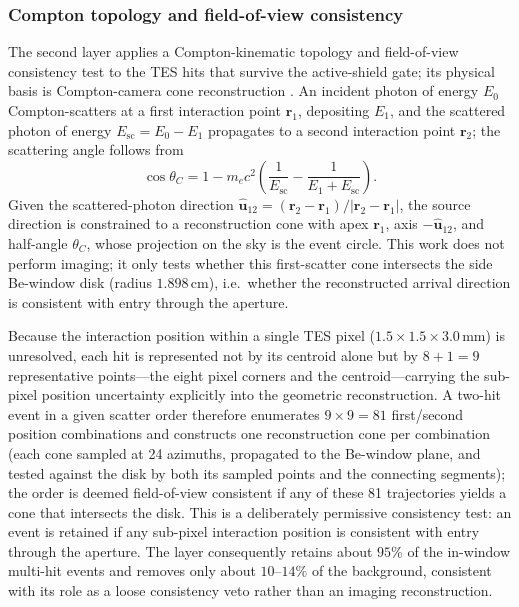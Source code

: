 \documentclass[11pt]{article}
\begin{document}
\subsubsection{Compton topology and field-of-view consistency}

The second layer applies a Compton-kinematic topology and field-of-view
consistency test to the TES hits that survive the active-shield gate; its
physical basis is Compton-camera cone reconstruction \cite{Zoglauer2006}. An
incident photon of energy $E_0$ Compton-scatters at a first interaction point
$\mathbf r_1$, depositing $E_1$, and the scattered photon of energy
$E_{\mathrm{sc}}=E_0-E_1$ propagates to a second interaction point $\mathbf r_2$;
the scattering angle follows from
\begin{equation}
  \cos\theta_C =
  1 - m_ec^2\left(\frac{1}{E_{\mathrm{sc}}}
  - \frac{1}{E_1+E_{\mathrm{sc}}}\right).
\end{equation}
Given the scattered-photon direction
$\hat{\mathbf u}_{12}=(\mathbf r_2-\mathbf r_1)/|\mathbf r_2-\mathbf r_1|$, the
source direction is constrained to a reconstruction cone with apex $\mathbf r_1$,
axis $-\hat{\mathbf u}_{12}$, and half-angle $\theta_C$, whose projection on the
sky is the event circle. This work does not perform imaging; it only tests
whether this first-scatter cone intersects the side Be-window disk (radius
$1.898\,\mathrm{cm}$), i.e.\ whether the reconstructed arrival direction is
consistent with entry through the aperture.

Because the interaction position within a single TES pixel
($1.5\times1.5\times3.0\,\mathrm{mm}$) is unresolved, each hit is represented not
by its centroid alone but by $8+1=9$ representative points---the eight pixel
corners and the centroid---carrying the sub-pixel position uncertainty
explicitly into the geometric reconstruction. A two-hit event in a given scatter
order therefore enumerates $9\times9=81$ first/second position combinations and
constructs one reconstruction cone per combination (each cone sampled at 24
azimuths, propagated to the Be-window plane, and tested against the disk by both
its sampled points and the connecting segments); the order is deemed
field-of-view consistent if any of these 81 trajectories yields a cone that
intersects the disk. This is a deliberately permissive consistency test: an
event is retained if any sub-pixel interaction position is consistent with entry
through the aperture. The layer consequently retains about $95\%$ of the
in-window multi-hit events and removes only about $10$--$14\%$ of the background,
consistent with its role as a loose consistency veto rather than an imaging
reconstruction.
\end{document}
